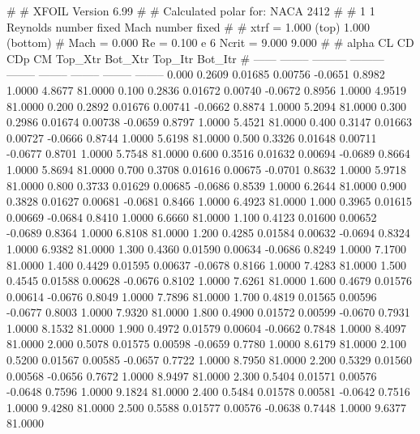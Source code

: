 #  
#       XFOIL         Version 6.99
#  
# Calculated polar for: NACA 2412                                       
#  
# 1 1 Reynolds number fixed          Mach number fixed         
#  
# xtrf =   1.000 (top)        1.000 (bottom)  
# Mach =   0.000     Re =     0.100 e 6     Ncrit =   9.000  9.000
#  
#   alpha    CL        CD       CDp       CM     Top_Xtr  Bot_Xtr  Top_Itr  Bot_Itr
#  ------ -------- --------- --------- -------- -------- -------- -------- --------
   0.000   0.2609   0.01685   0.00756  -0.0651   0.8982   1.0000   4.8677  81.0000
   0.100   0.2836   0.01672   0.00740  -0.0672   0.8956   1.0000   4.9519  81.0000
   0.200   0.2892   0.01676   0.00741  -0.0662   0.8874   1.0000   5.2094  81.0000
   0.300   0.2986   0.01674   0.00738  -0.0659   0.8797   1.0000   5.4521  81.0000
   0.400   0.3147   0.01663   0.00727  -0.0666   0.8744   1.0000   5.6198  81.0000
   0.500   0.3326   0.01648   0.00711  -0.0677   0.8701   1.0000   5.7548  81.0000
   0.600   0.3516   0.01632   0.00694  -0.0689   0.8664   1.0000   5.8694  81.0000
   0.700   0.3708   0.01616   0.00675  -0.0701   0.8632   1.0000   5.9718  81.0000
   0.800   0.3733   0.01629   0.00685  -0.0686   0.8539   1.0000   6.2644  81.0000
   0.900   0.3828   0.01627   0.00681  -0.0681   0.8466   1.0000   6.4923  81.0000
   1.000   0.3965   0.01615   0.00669  -0.0684   0.8410   1.0000   6.6660  81.0000
   1.100   0.4123   0.01600   0.00652  -0.0689   0.8364   1.0000   6.8108  81.0000
   1.200   0.4285   0.01584   0.00632  -0.0694   0.8324   1.0000   6.9382  81.0000
   1.300   0.4360   0.01590   0.00634  -0.0686   0.8249   1.0000   7.1700  81.0000
   1.400   0.4429   0.01595   0.00637  -0.0678   0.8166   1.0000   7.4283  81.0000
   1.500   0.4545   0.01588   0.00628  -0.0676   0.8102   1.0000   7.6261  81.0000
   1.600   0.4679   0.01576   0.00614  -0.0676   0.8049   1.0000   7.7896  81.0000
   1.700   0.4819   0.01565   0.00596  -0.0677   0.8003   1.0000   7.9320  81.0000
   1.800   0.4900   0.01572   0.00599  -0.0670   0.7931   1.0000   8.1532  81.0000
   1.900   0.4972   0.01579   0.00604  -0.0662   0.7848   1.0000   8.4097  81.0000
   2.000   0.5078   0.01575   0.00598  -0.0659   0.7780   1.0000   8.6179  81.0000
   2.100   0.5200   0.01567   0.00585  -0.0657   0.7722   1.0000   8.7950  81.0000
   2.200   0.5329   0.01560   0.00568  -0.0656   0.7672   1.0000   8.9497  81.0000
   2.300   0.5404   0.01571   0.00576  -0.0648   0.7596   1.0000   9.1824  81.0000
   2.400   0.5484   0.01578   0.00581  -0.0642   0.7516   1.0000   9.4280  81.0000
   2.500   0.5588   0.01577   0.00576  -0.0638   0.7448   1.0000   9.6377  81.0000
